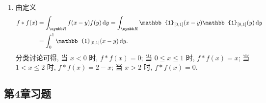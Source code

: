 \begin{enumerate}
\begin{answer}
\begin{enumerate}
        \item 由定义
        \begin{align*}
            f*f(x)
            & =\int_{\R } f(x-y)f(y)\diff y=\int_{\R } \mathbb{1}_{[0,1]}(x-y)\mathbb{1}_{[0,1]}(y)\diff y \\
            & =\int_0^1 \mathbb{1}_{[0,1]}(x-y)\diff y.
        \end{align*}
        分类讨论可得, 当 $x<0$ 时, $f*f(x)=0$;
        当 $0\leq x\leq 1$ 时, $f*f(x)=x$;
        当 $1<x\leq 2$ 时, $f*f(x)=2-x$;
        当 $x>2$ 时, $f*f(x)=0$.
      \end{enumerate}
    \end{answer}
\end{enumerate}




\subsection{第4章习题}
